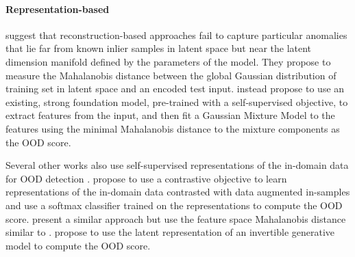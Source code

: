 \paragraph{Representation-based}
%
\textcite{denouden_improving_2018} suggest that reconstruction-based approaches fail to capture particular anomalies that lie far from known inlier samples in latent space but near the latent dimension manifold defined by the parameters of the model. They propose to measure the Mahalanobis distance between the global Gaussian distribution of training set in latent space and an encoded test input. 
\textcite{xiao_we_2021} instead propose to use an existing, strong foundation model, pre-trained with a self-supervised objective, to extract features from the input, and then fit a Gaussian Mixture Model to the features using the minimal Mahalanobis distance to the mixture components as the OOD score.

Several other works also use self-supervised representations of the in-domain data for OOD detection \cite{hendrycks_using_2019,bergman_classificationbased_2020}. 
\textcite{tack_csi_2020} propose to use a contrastive objective to learn representations of the in-domain data contrasted with data augmented in-samples and use a softmax classifier trained on the representations to compute the OOD score. \textcite{sehwag_ssd_2021} present a similar approach but use the feature space Mahalanobis distance similar to \textcite{denouden_improving_2018}. 
\textcite{ahmadian_likelihoodfree_2021} propose to use the latent representation of an invertible generative model to compute the OOD score.


